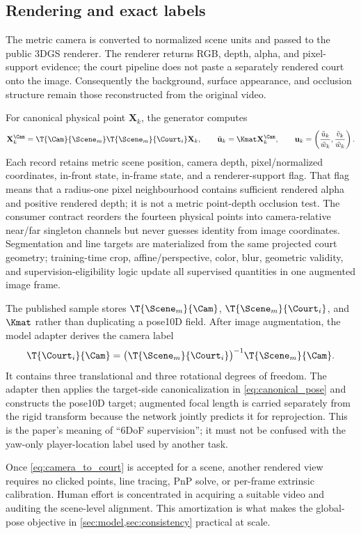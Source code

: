

\subsection{Rendering and exact labels}
\label{sec:labels}

The metric camera is converted to normalized scene units and passed to the
public 3DGS renderer.  The renderer returns RGB, depth, alpha, and pixel-support
evidence;
the court pipeline does not paste a separately rendered court onto the image.
Consequently the background, surface appearance, and occlusion structure
remain those reconstructed from the original video.

For canonical physical point \(\mathbf{X}_k\), the generator computes
\begin{equation}
  \mathbf{X}^{\Cam}_k =
  \T{\Cam}{\Scene_m}\T{\Scene_m}{\Court_i}\mathbf{X}_k,
  \qquad
  \tilde{\mathbf{u}}_k=\Kmat\mathbf{X}^{\Cam}_k,
  \qquad
  \mathbf{u}_k=\left(\frac{\tilde u_k}{\tilde w_k},
                       \frac{\tilde v_k}{\tilde w_k}\right).
  \label{eq:label_projection}
\end{equation}
Each record retains metric scene position, camera depth, pixel/normalized
coordinates, in-front state, in-frame state, and a renderer-support flag.  That
flag means that a radius-one pixel neighbourhood contains sufficient rendered
alpha and positive rendered depth; it is not a metric point-depth occlusion
test.  The
consumer contract reorders the fourteen physical points into camera-relative
near/far singleton channels but never guesses identity from image coordinates.
Segmentation and line targets are materialized from the same projected court
geometry; training-time crop, affine/perspective, color, blur, geometric
validity, and supervision-eligibility logic update all supervised quantities in
one augmented image frame.

The published sample stores \(\T{\Scene_m}{\Cam}\),
\(\T{\Scene_m}{\Court_i}\), and \(\Kmat\) rather than duplicating a pose10D
field.  After image augmentation, the model adapter derives the camera label
\begin{equation}
  \T{\Court_i}{\Cam}=
  \bigl(\T{\Scene_m}{\Court_i}\bigr)^{-1}\T{\Scene_m}{\Cam}.
  \label{eq:camera_to_court}
\end{equation}
It contains three translational and three rotational degrees of freedom.  The
adapter then applies the target-side canonicalization in
\cref{eq:canonical_pose} and constructs the pose10D target; augmented focal
length is carried separately from the rigid transform because the network
jointly predicts it for reprojection.  This is the paper's meaning of ``6DoF
supervision''; it must not be confused with the yaw-only player-location label
used by another task.

Once \cref{eq:camera_to_court} is accepted for a scene, another rendered view
requires no clicked points, line tracing, PnP solve, or per-frame extrinsic
calibration.  Human effort is concentrated in acquiring a suitable video and
auditing the scene-level alignment.  This amortization is what makes the
global-pose objective in \cref{sec:model,sec:consistency} practical at scale.

